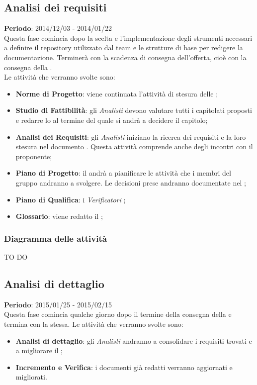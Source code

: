 	\subsection{Analisi dei requisiti} %
	\label{sub:analisi_dei_requisiti}
	\textbf{Periodo}: 2014/12/03 - 2014/01/22 \\
	Questa fase comincia dopo la scelta e l'implementazione degli strumenti necessari a definire il repository utilizzato dal team e le strutture di base per redigere la documentazione. Terminerà con la scadenza di consegna dell'offerta, cioè con la consegna della \RR. \\
	Le attività che verranno svolte sono:
		\begin{itemize}
			\item \textbf{Norme di Progetto}: viene continuata l'attività di stesura delle \docNameVersionNdP;
			\item \textbf{Studio di Fattibilità}: gli \emph{Analisti} devono valutare tutti i capitolati proposti e redarre lo \docNameVersionSdF{} al termine del quale si andrà a decidere il capitolo;
			\item \textbf{Analisi dei Requisiti}: gli \emph{Analisti} iniziano la ricerca dei requisiti e la loro stesura nel documento \docNameVersionAdR{}. Questa attività comprende anche degli incontri con il proponente;
			\item \textbf{Piano di Progetto}: il \roleProjectManager{} andrà a pianificare le attività che i membri del gruppo andranno a svolgere. Le decisioni prese andranno documentate nel \docNameVersionPdP;
			\item \textbf{Piano di Qualifica}: i \emph{Verificatori} ;
			\item \textbf{Glossario}: viene redatto il \docNameVersionGlo;
		\end{itemize}
	
		\subsubsection{Diagramma delle attività} %
		\label{ssub:diagramma_delle_attivita}
		TO DO
	
	
	\subsection{Analisi di dettaglio} %
	\label{sub:analisi_di_dettaglio}
	\textbf{Periodo}: 2015/01/25 - 2015/02/15 \\
	Questa fase comincia qualche giorno dopo il termine della consegna della \RR{} e termina con la \RR{} stessa.
	Le attività che verranno svolte sono:
		\begin{itemize}
			\item \textbf{Analisi di dettaglio}: gli \emph{Analisti} andranno a consolidare i requisiti trovati e a migliorare il \docNameVersionAdR;
			\item \textbf{Incremento e Verifica}: i documenti già redatti verranno aggiornati e migliorati.
		\end{itemize}
	
